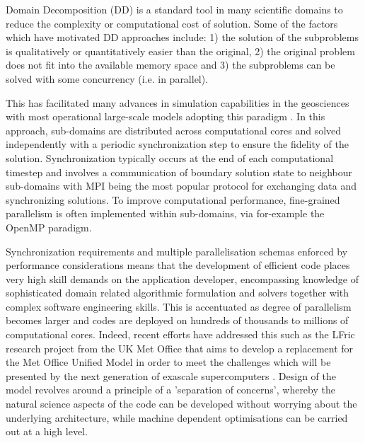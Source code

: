 \documentclass[acmsmall,review,anonymous]{acmart}\settopmatter{printfolios=true,printccs=false,printacmref=false}
\begin{document}
Domain Decomposition (DD) is a standard tool in many scientific domains to reduce the complexity or computational cost of solution. Some of the factors which have motivated DD approaches include: 1) the solution of the subproblems is qualitatively or quantitatively easier than the original, 2) the original problem does not fit into the available memory space and 3) the subproblems can be solved with some concurrency (i.e. in parallel).

This has facilitated many advances in simulation capabilities in the geosciences with most operational large-scale models adopting this paradigm \citep{michalakes2001development, hu2013scalable, hammond2014evaluating}. In this approach, sub-domains are distributed across computational cores and solved independently with a periodic synchronization step to ensure the fidelity of the solution. Synchronization typically occurs at the end of each computational timestep and involves a communication of boundary solution state to neighbour sub-domains with MPI being the most popular protocol for exchanging data and synchronizing solutions. To improve computational performance, fine-grained parallelism is often implemented within sub-domains, via for-example the OpenMP paradigm.

Synchronization requirements and multiple parallelisation schemas enforced by performance considerations means that the development of efficient code places very high skill demands on the application developer, encompassing knowledge of sophisticated domain related algorithmic formulation and solvers together with complex software engineering skills. This is accentuated as degree of parallelism becomes larger and codes are deployed on hundreds of thousands to millions of computational cores. Indeed, recent efforts have addressed this such as the LFric research project from the UK Met Office that aims to develop a replacement for the Met Office Unified Model in order to meet the challenges which will be presented by the next generation of exascale supercomputers \citep{melvin2017lfric}. Design of the model revolves around a principle of a 'separation of concerns', whereby the natural science aspects of the code can be developed without worrying about the underlying architecture, while machine dependent optimisations can be carried out at a high level.
\end{document}
